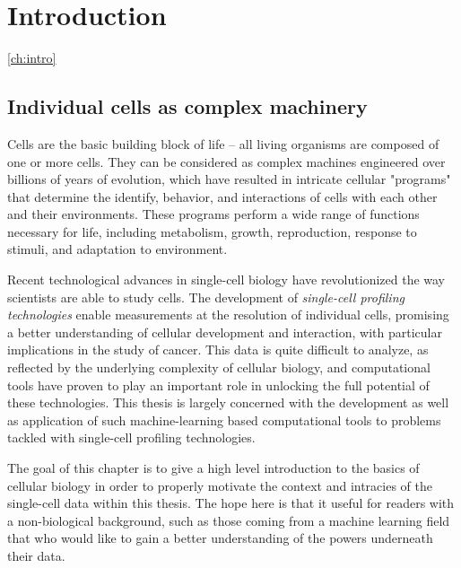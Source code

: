 
\chapter{Introduction} \ref{ch:intro}


\section{Individual cells as complex machinery}
Cells are the basic building block of life -- all living organisms are composed of one or more cells.
They can be considered as complex machines engineered over billions of years of evolution,
which have resulted in intricate cellular "programs" that determine the identify, behavior, and interactions of cells with each other and their environments.
These programs perform a wide range of functions necessary for life, including metabolism, growth, reproduction, response to stimuli, and adaptation to environment.

Recent technological advances in single-cell biology have revolutionized the way scientists are able to study cells.
The development of \emph{single-cell profiling technologies} enable measurements at the resolution of individual cells,
promising a better understanding of cellular development and interaction, with particular implications in the study of cancer.
This data is quite difficult to analyze, as reflected by the underlying complexity of cellular biology, and
computational tools have proven to play an important role in unlocking the full potential of these technologies.
This thesis is largely concerned with the development as well as application of such machine-learning based computational tools to problems tackled with single-cell profiling technologies.

The goal of this chapter is to give a high level introduction to the basics of cellular biology in order to properly motivate the context and intracies of the single-cell data within this thesis.
The hope here is that it useful for readers with a non-biological background, such as those coming from a machine learning field that who would like to gain a better understanding of the powers underneath their data.

